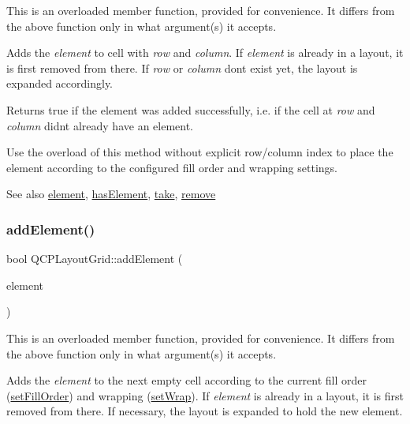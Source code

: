 This is an overloaded member function, provided for convenience. It differs from the above function only in what argument(s) it accepts.

Adds the {\itshape element} to cell with {\itshape row} and {\itshape column}. If {\itshape element} is already in a layout, it is first removed from there. If {\itshape row} or {\itshape column} don\textquotesingle{}t exist yet, the layout is expanded accordingly.

Returns true if the element was added successfully, i.\+e. if the cell at {\itshape row} and {\itshape column} didn\textquotesingle{}t already have an element.

Use the overload of this method without explicit row/column index to place the element according to the configured fill order and wrapping settings.

\begin{DoxySeeAlso}{See also}
\mbox{\hyperlink{class_q_c_p_layout_grid_a602b426609b4411cf6a93c3ddf3a381a}{element}}, \mbox{\hyperlink{class_q_c_p_layout_grid_ab0cf4f7edc9414a3bfaddac0f46dc0a0}{has\+Element}}, \mbox{\hyperlink{class_q_c_p_layout_grid_aee961c2eb6cf8a85dcbc5a7d7b6c1a00}{take}}, \mbox{\hyperlink{class_q_c_p_layout_a6c58f537d8086f352576ab7c5b15d0bc}{remove}} 
\end{DoxySeeAlso}
\mbox{\label{class_q_c_p_layout_grid_a4c44025dd25acd27e053cadfd448ad7b}} 
\subsubsection{\texorpdfstring{addElement()}{addElement()}\hspace{0.1cm}{\footnotesize\ttfamily [2/2]}}
{\footnotesize\ttfamily bool Q\+C\+P\+Layout\+Grid\+::add\+Element (\begin{DoxyParamCaption}\item[{\mbox{\hyperlink{class_q_c_p_layout_element}{Q\+C\+P\+Layout\+Element}} $\ast$}]{element }\end{DoxyParamCaption})}

This is an overloaded member function, provided for convenience. It differs from the above function only in what argument(s) it accepts.

Adds the {\itshape element} to the next empty cell according to the current fill order (\mbox{\hyperlink{class_q_c_p_layout_grid_affc2f3cfd22f28698c5b29b960d2a391}{set\+Fill\+Order}}) and wrapping (\mbox{\hyperlink{class_q_c_p_layout_grid_ab36af18d77e4428386d02970382ee598}{set\+Wrap}}). If {\itshape element} is already in a layout, it is first removed from there. If necessary, the layout is expanded to hold the new element.

